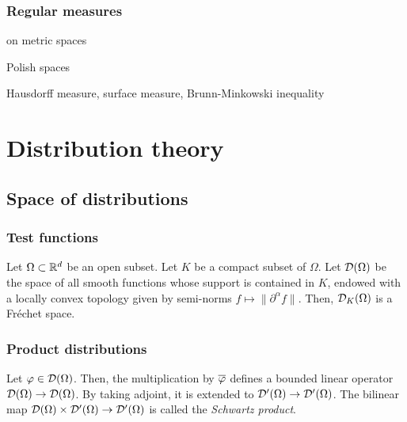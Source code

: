 \documentclass{../../large}
\begin{document}
\section{Regular measures}

on metric spaces

Polish spaces


Hausdorff measure, surface measure, Brunn-Minkowski inequality









\part{Distribution theory}

\chapter{Space of distributions}
\section{Test functions}

\begin{prb}
Let $\Omega\subset\mathbb{R}^d$ be an open subset.
Let $K$ be a compact subset of $\Omega$.
Let $\mathcal{D}(\Omega)$ be the space of all smooth functions whose support is contained in $K$, endowed with a locally convex topology given by semi-norms $f\mapsto\|\partial^\alpha f\|$.
Then, $\mathcal{D}_K(\Omega)$ is a Fr\'echet space.

\end{prb}





\section{Product distributions}




\begin{prb}
\end{prb}

\begin{prb}[Translation?]
\end{prb}
\begin{prb}
Let $\varphi\in\mathcal{D}(\Omega)$.
Then, the multiplication by $\overline{\varphi}$ defines a bounded linear operator $\mathcal{D}(\Omega)\to\mathcal{D}(\Omega)$.
By taking adjoint, it is extended to $\mathcal{D}'(\Omega)\to\mathcal{D}'(\Omega)$.
The bilinear map $\mathcal{D}(\Omega)\times\mathcal{D}'(\Omega)\to\mathcal{D}'(\Omega)$ is called the \emph{Schwartz product}.
\end{prb}
\end{document}
